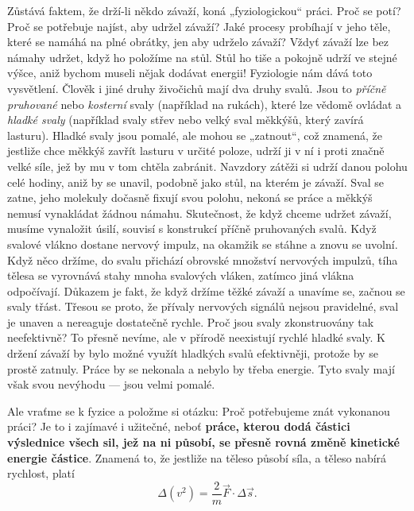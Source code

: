     Zůstává faktem, že drží-li někdo závaží, koná „fyziologickou“ práci. Proč se potí? Proč se 
    potřebuje najíst, aby udržel závaží? Jaké procesy probíhají v jeho těle, které se namáhá na 
    plné obrátky, jen aby udrželo závaží? Vždyť závaží lze bez námahy udržet, když ho položíme na 
    stůl. Stůl ho tiše a pokojně udrží ve stejné výšce, aniž bychom museli nějak dodávat energii! 
    Fyziologie nám dává toto vysvětlení. Člověk i jiné druhy živočichů mají dva druhy svalů. Jsou 
    to \emph{příčně pruhované} nebo \emph{kosterní} svaly (například na rukách), které lze vědomě 
    ovládat a \emph{hladké svaly} (například svaly střev nebo velký sval měkkýšů, který zavírá 
    lasturu). Hladké svaly jsou pomalé, ale mohou se „zatnout“, což znamená, že jestliže chce 
    měkkýš zavřít lasturu v určité poloze, udrží ji v ní i proti značně velké síle, jež by mu v tom 
    chtěla zabránit. Navzdory zátěži si udrží danou polohu celé hodiny, aniž by se unavil, podobně 
    jako stůl, na kterém je závaží. Sval se zatne, jeho molekuly dočasně fixují svou polohu, nekoná 
    se práce a měkkýš nemusí vynakládat žádnou námahu. Skutečnost, že když chceme udržet závaží, 
    musíme vynaložit úsilí, souvisí s konstrukcí příčně pruhovaných svalů. Když svalové vlákno 
    dostane nervový impulz, na okamžik se stáhne a znovu se uvolní. Když něco držíme, do svalu 
    přichází obrovské množství nervových impulzů, tíha tělesa se vyrovnává stahy mnoha svalových 
    vláken, zatímco jiná vlákna odpočívají. Důkazem je fakt, že když držíme těžké závaží a unavíme 
    se, začnou se svaly třást. Třesou se proto, že přívaly nervových signálů nejsou pravidelné, 
    sval je unaven a nereaguje dostatečně rychle. Proč jsou svaly zkonstruovány tak neefektivně? To 
    přesně nevíme, ale v přírodě neexistují rychlé hladké svaly. K držení závaží by bylo možné 
    využít hladkých svalů efektivněji, protože by se prostě zatnuly. Práce by se nekonala a nebylo 
    by třeba energie. Tyto svaly mají však svou nevýhodu — jsou velmi pomalé.
    
    Ale vraťme se k fyzice a položme si otázku: Proč potřebujeme znát vykonanou práci? Je to i 
    zajímavé i užitečné, neboť \textbf{práce, kterou dodá částici výslednice všech sil, jež na ni 
    působí, se přesně rovná změně kinetické energie částice}. Znamená to, že jestliže na těleso 
    působí síla, a těleso nabírá rychlost, platí
    \begin{equation}\label{FYZ:eq018}
      \Delta(v^2) = \frac{2}{m}\vec{F}\cdot\Delta\vec{s}.
    \end{equation}
  
